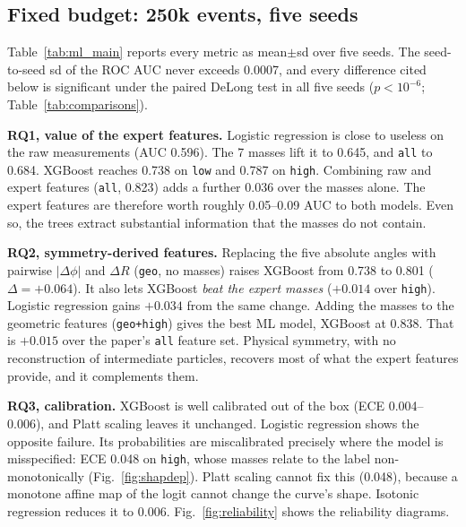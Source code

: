 

\subsection{Fixed budget: 250k events, five seeds}
Table~\ref{tab:ml_main} reports every metric as mean$\pm$sd over five seeds. The seed-to-seed sd of
the ROC AUC never exceeds 0.0007, and every difference cited below is significant under the paired
DeLong test in all five seeds ($p<10^{-6}$; Table~\ref{tab:comparisons}).



\textbf{RQ1, value of the expert features.} Logistic regression is close to useless on the raw
measurements (AUC 0.596). The 7 masses lift it to 0.645, and \texttt{all} to 0.684. XGBoost reaches
0.738 on \texttt{low} and 0.787 on \texttt{high}. Combining raw and expert features (\texttt{all},
0.823) adds a further 0.036 over the masses alone. The expert features are therefore worth roughly
0.05--0.09 AUC to both models. Even so, the trees extract substantial information that the masses
do not contain.

\textbf{RQ2, symmetry-derived features.} Replacing the five absolute angles with pairwise
$|\Delta\phi|$ and $\Delta R$ (\texttt{geo}, no masses) raises XGBoost from 0.738 to 0.801
($\Delta=+0.064$). It also lets XGBoost \emph{beat the expert masses} ($+0.014$ over \texttt{high}).
Logistic regression gains $+0.034$ from the same change. Adding the masses to the geometric
features (\texttt{geo+high}) gives the best ML model, XGBoost at 0.838. That is $+0.015$ over the
paper's \texttt{all} feature set. Physical symmetry, with no reconstruction of intermediate
particles, recovers most of what the expert features provide, and it complements them.

\textbf{RQ3, calibration.} XGBoost is well calibrated out of the box (ECE 0.004--0.006), and Platt
scaling leaves it unchanged. Logistic regression shows the opposite failure. Its probabilities are
miscalibrated precisely where the model is misspecified: ECE 0.048 on \texttt{high}, whose masses
relate to the label non-monotonically (Fig.~\ref{fig:shapdep}). Platt scaling cannot fix this
(0.048), because a monotone affine map of the logit cannot change the curve's shape. Isotonic
regression reduces it to 0.006. Fig.~\ref{fig:reliability} shows the reliability diagrams.

